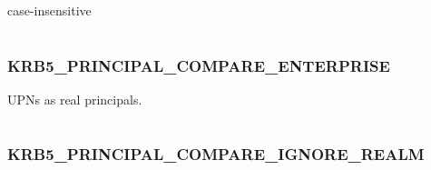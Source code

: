 \documentclass[letterpaper,10pt,english]{sphinxmanual}
\begin{document}
case-insensitive

\begin{tabulary}{\linewidth}{|L|L|}
\hline

 & 
\\\hline
\end{tabulary}



\subsubsection{KRB5\_PRINCIPAL\_COMPARE\_ENTERPRISE}
\label{appdev/refs/macros/KRB5_PRINCIPAL_COMPARE_ENTERPRISE:krb5-principal-compare-enterprise}\label{appdev/refs/macros/KRB5_PRINCIPAL_COMPARE_ENTERPRISE:krb5-principal-compare-enterprise-data}\label{appdev/refs/macros/KRB5_PRINCIPAL_COMPARE_ENTERPRISE::doc}

\begin{fulllineitems}
\label{appdev/refs/macros/KRB5_PRINCIPAL_COMPARE_ENTERPRISE:KRB5_PRINCIPAL_COMPARE_ENTERPRISE}
\end{fulllineitems}


UPNs as real principals.

\begin{tabulary}{\linewidth}{|L|L|}
\hline

 & 
\\\hline
\end{tabulary}



\subsubsection{KRB5\_PRINCIPAL\_COMPARE\_IGNORE\_REALM}
\label{appdev/refs/macros/KRB5_PRINCIPAL_COMPARE_IGNORE_REALM:krb5-principal-compare-ignore-realm}\label{appdev/refs/macros/KRB5_PRINCIPAL_COMPARE_IGNORE_REALM::doc}\label{appdev/refs/macros/KRB5_PRINCIPAL_COMPARE_IGNORE_REALM:krb5-principal-compare-ignore-realm-data}

\begin{fulllineitems}
\label{appdev/refs/macros/KRB5_PRINCIPAL_COMPARE_IGNORE_REALM:KRB5_PRINCIPAL_COMPARE_IGNORE_REALM}
\end{fulllineitems}
\end{document}

